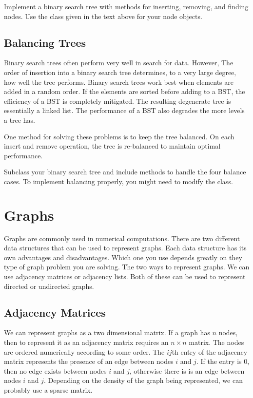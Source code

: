 \begin{problem}
Implement a binary search tree with methods for inserting, removing, and finding nodes.
Use the  class given in the text above for your node objects.
\end{problem}

\subsection*{Balancing Trees}
Binary search trees often perform very well in search for data.
However, The order of insertion into a binary search tree determines, to a very large degree, how well the tree performs.
Binary search trees work best when elements are added in a random order.
If the elements are sorted before adding to a BST, the efficiency of a BST is completely mitigated.  The resulting degenerate tree is essentially a linked list.
The performance of a BST also degrades the more levels a tree has. 

One method for solving these problems is to keep the tree balanced.
On each insert and remove operation, the tree is re-balanced to maintain optimal performance.


\begin{problem}
Subclass your binary search tree and include methods to handle the four balance cases.
To implement balancing properly, you might need to modify the  class.
\end{problem}

\section*{Graphs}
Graphs are commonly used in numerical computations.
There are two different data structures that can be used to represent graphs.
Each data structure has its own advantages and disadvantages.
Which one you use depends greatly on they type of graph problem you are solving.
The two ways to represent graphs.  We can use adjacency matrices or adjacency lists.
Both of these can be used to represent directed or undirected graphs.

\subsection*{Adjacency Matrices}
We can represent graphs as a two dimensional matrix.  If a graph has $n$ nodes, then
to represent it as an adjacency matrix requires an $n \times n$ matrix.
The nodes are ordered numerically according to some order.
The $ij$th entry of the adjacency matrix represents the presence of an edge between nodes $i$ and $j$.
If the entry is 0, then no edge exists between nodes $i$ and $j$, otherwise there is is an edge between nodes $i$ and $j$.
Depending on the density of the graph being represented, we can probably use a sparse matrix.

